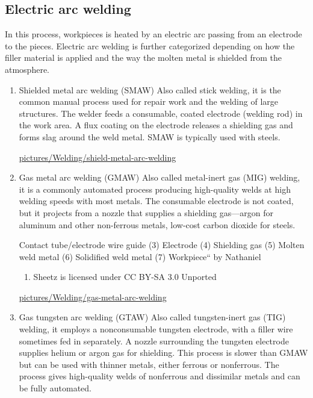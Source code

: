 \documentclass[a4paper,openany,12pt]{book}
\begin{document}
{{\subsection{Electric arc welding}
\label{electric-arc-welding}
In this process, workpieces is heated by an electric arc passing from an
electrode to the pieces. Electric arc welding is further categorized
depending on how the filler material is applied and the way the molten
metal is shielded from the atmosphere.

\begin{enumerate}
\item Shielded metal arc welding (SMAW)
\label{shielded-metal-arc-welding-smaw}
Also called stick welding, it is the common manual process used for
repair work and the welding of large structures. The welder feeds a
consumable, coated electrode (welding rod) in the work area. A flux
coating on the electrode releases a shielding gas and forms slag around
the weld metal. SMAW is typically used with steels.


\url{pictures/Welding/shield-metal-arc-welding}

\item Gas metal arc welding (GMAW)
\label{gas-metal-arc-welding-gmaw}
Also called metal-inert gas (MIG) welding, it is a commonly automated
process producing high-quality welds at high welding speeds with most
metals. The consumable electrode is not coated, but it projects from a
nozzle that supplies a shielding gas---argon for aluminum and other
non-ferrous metals, low-cost carbon dioxide for steels.


Contact tube/electrode wire guide (3) Electrode (4) Shielding gas (5)
Molten weld metal (6) Solidified weld metal (7) Workpiece`` by Nathaniel
\begin{enumerate}
\item Sheetz is licensed under CC BY-SA 3.0 Unported
\end{enumerate}
\url{pictures/Welding/gas-metal-arc-welding}

\item Gas tungsten arc welding (GTAW)
\label{gas-tungsten-arc-welding-gtaw}
Also called tungsten-inert gas (TIG) welding, it employs a nonconsumable
tungsten electrode, with a filler wire sometimes fed in separately. A
nozzle surrounding the tungsten electrode supplies helium or argon gas
for shielding. This process is slower than GMAW but can be used with
thinner metals, either ferrous or nonferrous. The process gives
high-quality welds of nonferrous and dissimilar metals and can be fully
automated.



\end{enumerate}}}
\end{document}
